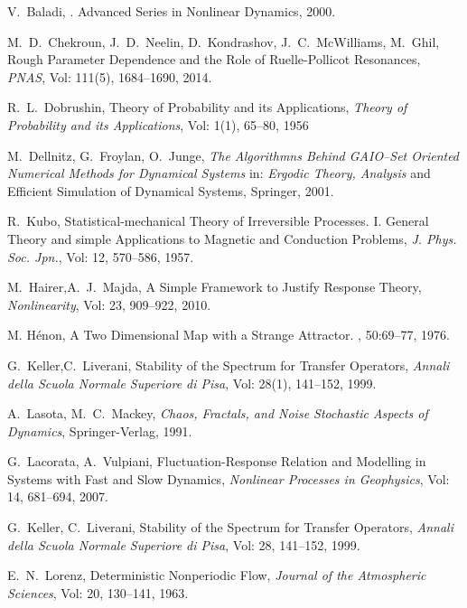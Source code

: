 \begin{thebibliography}{9999}

V.~Baladi,  .
\newblock Advanced Series in Nonlinear Dynamics, 2000.

M.~D.~Chekroun, J.~D.~Neelin, D.~Kondrashov, J.~C.~McWilliams, M.~Ghil, Rough Parameter Dependence and the Role of Ruelle-Pollicot Resonances, \emph{PNAS}, Vol: 111(5), 1684--1690, 2014.

R.~L.~Dobrushin, Theory of Probability and its Applications, \emph{Theory of Probability and its Applications}, Vol: 1(1), 65--80, 1956

M.~Dellnitz, G.~Froylan, O.~Junge, \emph{The Algorithmns Behind GAIO--Set Oriented Numerical Methods for Dynamical Systems} in: \emph{Ergodic Theory, Analysis} and Efficient Simulation of Dynamical Systems, Springer, 2001.

R.~Kubo, Statistical-mechanical Theory of Irreversible Processes. I. General Theory and simple Applications to Magnetic and Conduction Problems, \emph{J. Phys. Soc. Jpn.}, Vol: 12, 570--586, 1957.

M.~Hairer,A.~J.~Majda, A Simple Framework to Justify Response Theory, \emph{Nonlinearity}, Vol: 23, 909--922, 2010.

 M. H\'{e}non, A Two Dimensional Map with a Strange Attractor.
, 50:69--77, 1976.

G.~Keller,C.~Liverani, Stability of the Spectrum for Transfer Operators, \emph{Annali della Scuola Normale Superiore di Pisa}, Vol: 28(1), 141--152, 1999.

A.~Lasota, M.~C.~Mackey, \emph{Chaos, Fractals, and Noise Stochastic Aspects of Dynamics}, Springer-Verlag, 1991.

G.~Lacorata, A.~Vulpiani, Fluctuation-Response Relation and Modelling in Systems with Fast and Slow Dynamics, \emph{Nonlinear Processes in Geophysics}, Vol: 14, 681--694, 2007.

G.~Keller, C.~Liverani, Stability of the Spectrum for Transfer Operators, \emph{Annali della Scuola Normale Superiore di Pisa}, Vol: 28, 141--152, 1999.

E.~N.~Lorenz, Deterministic Nonperiodic Flow, \emph{Journal of the Atmospheric Sciences}, Vol: 20, 130--141, 1963.


\end{thebibliography}
